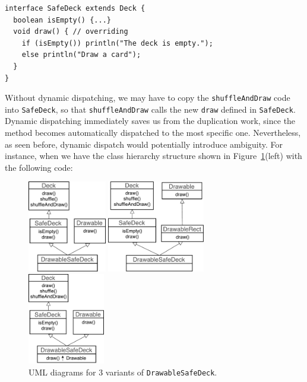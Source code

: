 \vspace{3pt}\begin{lstlisting}
interface SafeDeck extends Deck {
  boolean isEmpty() {...}
  void draw() { // overriding
    if (isEmpty()) println("The deck is empty.");
    else println("Draw a card");
  }
}
\end{lstlisting}\vspace{3pt}
Without dynamic dispatching, we may have to copy the \lstinline|shuffleAndDraw| code into \lstinline|SafeDeck|, so that \lstinline|shuffleAndDraw| calls the new \lstinline|draw| defined in \lstinline|SafeDeck|. Dynamic dispatching immediately saves us from the duplication work,
since the method becomes automatically dispatched to the most specific one. Nevertheless, as seen before, dynamic dispatch would potentially introduce ambiguity.
For instance, when we have the class hierarchy structure shown in Figure~\ref{fig:drawablesafedeck}(left) with the following code:

\begin{figure}[t]
  \centering
  \begin{minipage}[t]{0.32\textwidth}
  \includegraphics[height=4cm]{pics/DrawableSafeDeck1.pdf}
  \end{minipage}
  \centering
  \hspace*{2pt}
  \begin{minipage}[t]{0.38\textwidth}
  \includegraphics[height=4cm]{pics/DrawableSafeDeck0.pdf}
  \end{minipage}
  \centering
  \hspace*{2pt}
  \begin{minipage}[t]{0.25\textwidth}
  \includegraphics[height=4cm]{pics/DrawableSafeDeck3.pdf}
  \end{minipage}  
  \caption{UML diagrams for 3 variants of \lstinline|DrawableSafeDeck|.}\label{fig:drawablesafedeck}
\end{figure}

